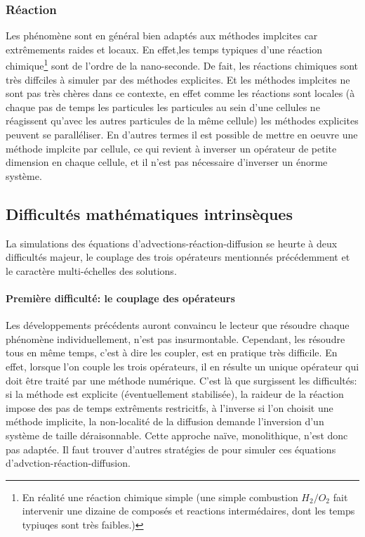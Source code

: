 \subsubsection{Réaction}
    Les phénomène sont en général bien adaptés aux méthodes implcites car extrêmements raides et locaux.
    En effet,les temps typiques d'une réaction chimique\footnote{
    En réalité une réaction chimique simple (une simple combustion $H_2/O_2$ fait intervenir une dizaine de composés et reactions intermédaires, dont les temps typiuqes sont très faibles.)} sont de l'ordre de la nano-seconde.
    De fait, les réactions chimiques sont très diffciles à simuler par des méthodes explicites.
    Et les méthodes implcites ne sont pas très chères dans ce contexte, en effet comme les réactions sont locales 
    (à chaque pas de temps les particules les particules au sein d'une cellules ne réagissent qu'avec les autres particules de la même cellule)
    les méthodes explicites peuvent se paralléliser. En d'autres termes il est possible de mettre en oeuvre une méthode implcite par cellule,
    ce qui revient à inverser un opérateur de petite dimension en chaque cellule, et il n'est pas nécessaire d'inverser un énorme système.

\subsection{Difficultés mathématiques intrinsèques}
    La simulations des équations d'advections-réaction-diffusion se heurte à deux difficultés majeur, le couplage des trois opérateurs mentionnés précédemment
    et le caractère multi-échelles des solutions.

    \paragraph{Première difficulté: le couplage des opérateurs}
        Les développements précédents auront convaincu le lecteur que résoudre chaque phénomène individuellement, n'est pas insurmontable. 
        Cependant, les résoudre tous en même temps, c'est à dire les coupler, est en pratique très difficile.
        En effet, lorsque l'on couple les trois opérateurs, il en résulte un unique opérateur qui doit être traité par une méthode numérique.
        C'est là que surgissent les difficultés: si la méthode est explicite (éventuellement stabilisée), la raideur de la réaction impose des pas de temps extrêments restricitfs,
        à l'inverse si l'on choisit une méthode implicite, la non-localité de la diffusion demande l'inversion d'un système de taille déraisonnable. 
        Cette approche naïve, monolithique, n'est donc pas adaptée. Il faut trouver d'autres stratégies de pour simuler ces équations d'advction-réaction-diffusion.

